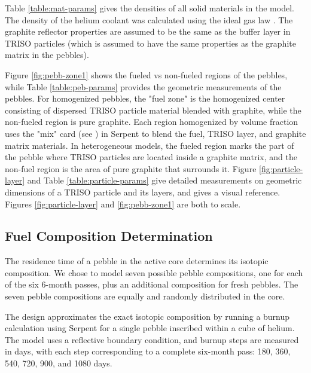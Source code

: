 

Table \ref{table:mat-params} gives the densities of all solid materials in the model.  The density of the helium coolant was calculated using the ideal gas law \cite{levine_derivation_nodate}.  The graphite reflector properties are assumed to be the same as the buffer layer in TRISO particles (which is assumed to have the same properties as the graphite matrix in the pebbles).



Figure \ref{fig:pebb-zone1} shows the fueled vs non-fueled regions of the pebbles, while Table \ref{table:peb-params} provides the geometric measurements of the pebbles.  For homogenized pebbles, the "fuel zone" is the homogenized center consisting of dispersed TRISO particle material blended with graphite, while the non-fueled region is pure graphite.  Each region homogenized by volume fraction uses the "mix" card (see \cite{leppanenjaakko_serpent_2015}) in Serpent to blend the fuel, TRISO layer, and graphite matrix materials.  In heterogeneous models, the fueled region marks the part of the pebble where TRISO particles are located inside a graphite matrix, and the non-fuel region is the area of pure graphite that surrounds it.  Figure \ref{fig:particle-layer} and Table \ref{table:particle-params} give detailed measurements on geometric dimensions of a TRISO particle and its layers, and gives a visual reference.  Figures \ref{fig:particle-layer} and \ref{fig:pebb-zone1} are both to scale.



\subsection{Fuel Composition Determination}
\label{meth-comp}

The residence time of a pebble in the active core determines its isotopic composition.  We chose to model seven possible pebble compositions, one for each of the six 6-month passes, plus an additional composition for fresh pebbles.  The seven pebble compositions are equally and randomly distributed in the core.

The design approximates the exact isotopic composition by running a burnup calculation using Serpent for a single pebble inscribed within a cube of helium.  The model uses a reflective boundary condition, and burnup steps are measured in days, with each step corresponding to a complete six-month pass: 180, 360, 540, 720, 900, and 1080 days.

